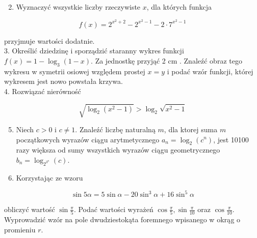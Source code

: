 \documentclass[10pt]{article}
\begin{document}
\begin{enumerate}
  \setcounter{enumi}{1}
  \item Wyznaczyć wszystkie liczby rzeczywiste $x$, dla których funkcja
\end{enumerate}

$$
f(x)=2^{x^{2}+2}-2^{x^{2}-1}-2 \cdot 7^{x^{2}-1}
$$

przyjmuje wartości dodatnie.\\
3. Określić dziedzinę i sporządzić staranny wykres funkcji $f(x)=1-\log _{3}(1-x)$. Za jednostkę przyjąć 2 cm . Znaleźć obraz tego wykresu w symetrii osiowej względem prostej $x=y$ i podać wzór funkcji, której wykresem jest nowo powstała krzywa.\\
4. Rozwiązać nierówność

$$
\sqrt{\log _{2}\left(x^{2}-1\right)}>\log _{2} \sqrt{x^{2}-1}
$$

\begin{enumerate}
  \setcounter{enumi}{4}
  \item Niech $c>0$ i $c \neq 1$. Znaleźć liczbę naturalną $m$, dla ktorej suma $m$ początkowych wyrazów ciągu arytmetycznego $a_{n}=\log _{2}\left(c^{n}\right)$, jest 10100 razy większa od sumy wszystkich wyrazów ciągu geometrycznego $b_{n}=\log _{2^{3^{n}}}(c)$.
  \item Korzystając ze wzoru
\end{enumerate}

$$
\sin 5 \alpha=5 \sin \alpha-20 \sin ^{3} \alpha+16 \sin ^{5} \alpha
$$

obliczyć wartość $\sin \frac{\pi}{5}$. Podać wartości wyrażeń $\cos \frac{\pi}{5}, \sin \frac{\pi}{10}$ oraz $\cos \frac{\pi}{10}$. Wyprowadzić wzór na pole dwudziestokąta foremnego wpisanego w okrąg o promieniu $r$.
\end{document}
